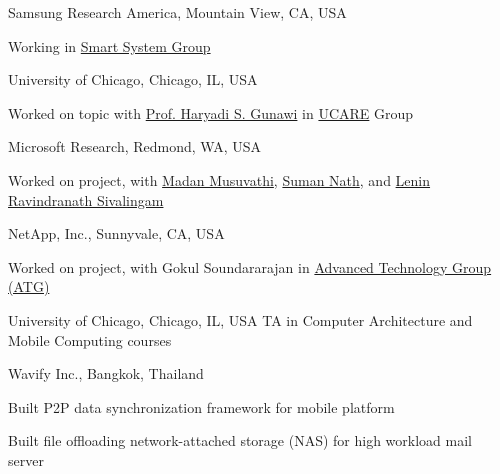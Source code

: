 \documentclass[10pt]{article} %
\begin{document}
{Samsung Research America, Mountain View, CA, USA}
{\begin{minipage}{\smallertextwidth}
Working in \href{https://www.sra.samsung.com/about-us/distributed-systems/}{Smart System Group}
\end{minipage}}

{University of Chicago, Chicago, IL, USA}
{\begin{minipage}{\smallertextwidth}
Worked on  topic
with \href{http://ucare.cs.uchicago.edu/}{Prof. Haryadi S. Gunawi}
in \href{http://ucare.cs.uchicago.edu/}{UCARE} Group
\end{minipage}} 

{Microsoft Research, Redmond, WA, USA}
{\begin{minipage}{\smallertextwidth}
Worked on  project,
with \href{https://www.microsoft.com/en-us/research/people/madanm/}{Madan Musuvathi}, 
\href{https://www.microsoft.com/en-us/research/people/sumann/}{Suman Nath}, 
and \href{http://people.csail.mit.edu/lenin/}{Lenin Ravindranath Sivalingam}
\end{minipage}} 


{NetApp, Inc., Sunnyvale, CA, USA}
{\begin{minipage}{\smallertextwidth}
Worked on  project, 
with Gokul Soundararajan
in \href{http://www.netapp.com/us/company/leadership/advanced-technology/}{Advanced Technology Group (ATG)} 
\end{minipage}}

{University of Chicago, Chicago, IL, USA}
{TA in Computer Architecture and Mobile Computing courses} 

{Wavify Inc., Bangkok, Thailand}
{\begin{minipage}{\smallertextwidth}
\begin{itemize-noindent}
\setlength\itemsep{-1ex}
\item Built P2P data synchronization framework for mobile platform
\item Built file offloading network-attached storage (NAS) for high workload mail server
\end{itemize-noindent}
\end{minipage}}
\end{document}
